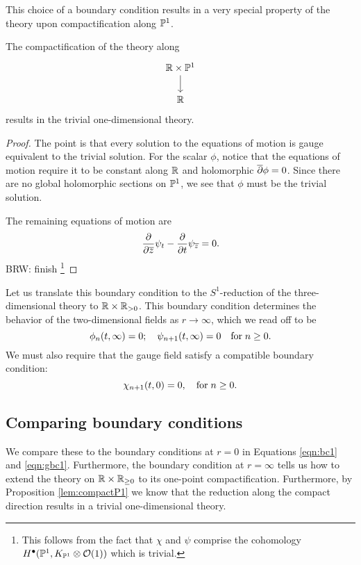 \documentclass[11pt]{amsart}
\def\brian#1{{\textcolor{blue!65!red}{BRW: {#1}}}}
\begin{document}
This choice of a boundary condition results in a very special property of the theory upon compactification along $\mathbb P^1$.

\begin{lem}\label{lem:compactP1}
The compactification of the theory along 
\[
\begin{tikzcd}
\RR \times \PP^1 \ar[d] \\ \RR
\end{tikzcd}
\]
results in the trivial one-dimensional theory. 
\end{lem}
\begin{proof}
The point is that every solution to the equations of motion is gauge equivalent to the trivial solution. 
For the scalar $\phi$, notice that the equations of motion require it to be constant along $\mathbb R$ and holomorphic $\overline{\partial} \phi = 0$. 
Since there are no global holomorphic sections on $\mathbb P^1$, we see that $\phi$ must be the trivial solution. 

The remaining equations of motion are
\[
\frac{\partial}{\partial {\overline{z}}} \psi_t - \frac{\partial}{\partial t} \psi_{\overline{z}} = 0 .
\]
\brian{finish} \footnote{This follows from the fact that $\chi$ and $\psi$ comprise the cohomology $H^\bullet(\mathbb P^1, K_{\mathbb P^1} \otimes \mathcal O(1))$ which is trivial.}


\end{proof}

Let us translate this boundary condition to the $S^1$-reduction of the three-dimensional theory to $\mathbb R \times \mathbb R_{>0}$. 
This boundary condition determines the behavior of the two-dimensional fields as $r \to \infty$, which we read off to be 
\begin{equation}\label{eqn:bc2}
\phi_n (t, \infty) = 0 ; \quad \psi_{n+1} (t, \infty) = 0 \quad {\rm for} \; n \geq 0 .
\end{equation}
We must also require that the gauge field satisfy a compatible boundary condition:
\begin{equation}\label{eqn:gbc2}
\chi_{n+1} (t,0) = 0, \quad {\rm for} \; n \geq 0 .
\end{equation}

\subsection*{Comparing boundary conditions}

We compare these to the boundary conditions at $r=0$ in Equations \eqref{eqn:bc1} and \eqref{eqn:gbc1}. 
Furthermore, the boundary condition at $r = \infty$ tells us how to extend the theory on $\mathbb R \times \mathbb R_{\geq 0}$ to its one-point compactification. 
Furthermore, by Proposition \ref{lem:compactP1} we know that the reduction along the compact direction results in a trivial one-dimensional theory.
\end{document}
